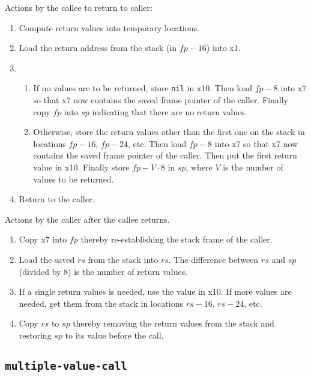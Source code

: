 Actions by the callee to return to caller:

\begin{enumerate}
\item Compute return values into temporary locations.
\item Load the return address from the stack (in $fp - 16$) into x1.
\item
  \begin{enumerate}
  \item If no values are to be returned, store \texttt{nil} in x10.
    Then load $fp - 8$ into x7 so that x7 now contains the saved frame
    pointer of the caller.  Finally copy $fp$ into $sp$ indicating
    that there are no return values.
  \item Otherwise, store the return values other than the first one on
    the stack in locations $fp - 16$, $fp - 24$, etc.  Then load $fp -
    8$ into x7 so that x7 now contains the saved frame pointer of the
    caller.  Then put the first return value in x10.  Finally store
    $fp - V \cdot 8$ in $sp$, where $V$ is the number of values to be
    returned.
  \end{enumerate}
\item Return to the caller.
\end{enumerate}

Actions by the caller after the callee returns.

\begin{enumerate}
\item Copy x7 into $fp$ thereby re-establishing the stack frame of the
  caller.
\item Load the saved $rs$ from the stack into $rs$.  The difference
  between $rs$ and $sp$ (divided by 8) is the number of return
  values.
\item If a single return values is needed, use the value in x10.  If
  more values are needed, get them from the stack in locations $rs -
  16$, $rs-24$, etc.
\item Copy $rs$ to $sp$ thereby removing the return values from the
  stack and restoring $sp$ to its value before the call.
\end{enumerate}

\subsection{\texttt{multiple-value-call}}

